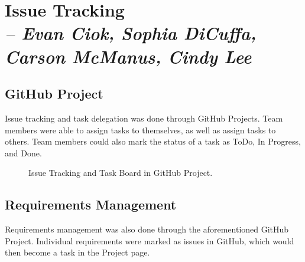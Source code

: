 \chapter{Issue Tracking \\
  \small{\textit{-- Evan Ciok, Sophia DiCuffa, Carson McManus, Cindy Lee}}
  \label{Chapter::IssueTracking}}

\section{GitHub Project}

Issue tracking and task delegation was done through GitHub Projects. Team members were able to assign tasks to themselves, as well as assign tasks to others. Team members could also mark the status of a task as ToDo, In Progress, and Done.

\begin{figure}[!htb]
    \centering
    \caption{\label{Figure::github-project} Issue Tracking and Task Board in GitHub Project.}
  \end{figure}

\section{Requirements Management}

Requirements management was also done through the aforementioned GitHub Project. Individual requirements were marked as issues in GitHub, which would then become a task in the Project page.